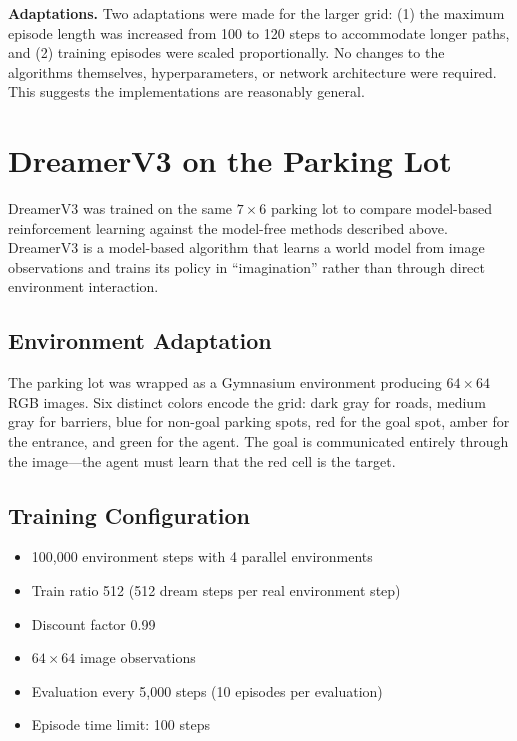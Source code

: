 \documentclass[letterpaper]{article}
\begin{document}
\textbf{Adaptations.} Two adaptations were made for the larger grid: (1) the maximum episode length was increased from 100 to 120 steps to accommodate longer paths, and (2) training episodes were scaled proportionally. No changes to the algorithms themselves, hyperparameters, or network architecture were required. This suggests the implementations are reasonably general.

\section{DreamerV3 on the Parking Lot}

DreamerV3 \citep{hafner2023dreamerv3} was trained on the same $7 \times 6$ parking lot to compare model-based reinforcement learning against the model-free methods described above. DreamerV3 is a model-based algorithm that learns a world model from image observations and trains its policy in ``imagination'' rather than through direct environment interaction.

\subsection{Environment Adaptation}

The parking lot was wrapped as a Gymnasium environment producing $64 \times 64$ RGB images. Six distinct colors encode the grid: dark gray for roads, medium gray for barriers, blue for non-goal parking spots, red for the goal spot, amber for the entrance, and green for the agent. The goal is communicated entirely through the image---the agent must learn that the red cell is the target.

\subsection{Training Configuration}

\begin{itemize}
    \item 100,000 environment steps with 4 parallel environments
    \item Train ratio 512 (512 dream steps per real environment step)
    \item Discount factor 0.99
    \item $64 \times 64$ image observations
    \item Evaluation every 5,000 steps (10 episodes per evaluation)
    \item Episode time limit: 100 steps
\end{itemize}
\end{document}
